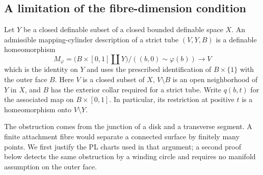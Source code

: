 \subsection{A limitation of the fibre-dimension condition}

Let $Y$ be a closed definable subset of a closed bounded definable
space $X$.  An admissible mapping-cylinder description of a strict
tube $(V,Y,B)$ is a definable homeomorphism
\[
 M_\varphi=
 \bigl(B\times[0,1]\amalg Y\bigr)/((b,0)\sim\varphi(b))
 \longrightarrow V
\]
which is the identity on $Y$ and uses the prescribed identification
of $B\times\{1\}$ with the outer face $B$.  Here $V$ is a closed
subset of $X$, $V\setminus B$ is an open neighborhood of $Y$ in $X$,
and $B$ has the exterior collar required for a strict tube.
Write $q(b,t)$ for the associated map on $B\times[0,1]$.
In particular, its restriction at positive $t$ is a homeomorphism
onto $V\setminus Y$.

The obstruction comes from the junction of a disk and a transverse
segment. A finite attachment fibre would separate a connected
surface by finitely many points. We first justify the PL charts used
in that argument; a second proof below detects the same obstruction
by a winding circle and requires no manifold assumption on the
outer face.

